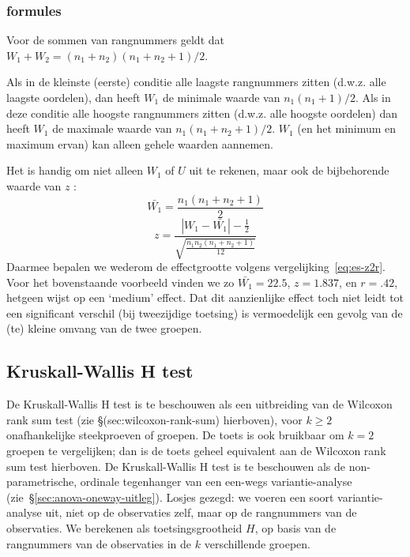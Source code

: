 \documentclass[
]{book}
\begin{document}
\hypertarget{formules-8}{%
\subsubsection{formules}\label{formules-8}}

Voor de sommen van rangnummers geldt dat
\(W_1 + W_2 = (n_1+n_2) (n_1+n_2+1) / 2\).

Als in de kleinste (eerste) conditie alle laagste rangnummers zitten
(d.w.z. alle laagste oordelen), dan heeft \(W_1\) de minimale waarde van
\(n_1 (n_1+1) /2\). Als in deze conditie alle hoogste rangnummers zitten
(d.w.z. alle hoogste oordelen) dan heeft \(W_1\) de maximale waarde van
\(n_1 (n_1+n_2+1) / 2\). \(W_1\) (en het minimum en maximum ervan) kan
alleen gehele waarden aannemen.

Het is handig om niet alleen \(W_1\) of \(U\) uit te rekenen, maar ook de
bijbehorende waarde van \(z\) \citep{Ferg89}:
\begin{equation}
  \label{eq:Wilcoxon-ranksum}
\bar{W_1} = \frac{ n_1 (n_1+n_2+1) }{ 2 }
\end{equation}
\begin{equation}
   \label{eq:Wilcoxon-ranksum-z}
  z = \frac{ |W_1-\bar{W_1}|-\frac{1}{2} }{ \sqrt{ \frac{n_1 n_2 (n_1+n_2+1)}{12} } }
\end{equation}
Daarmee bepalen we wederom de effectgrootte volgens
vergelijking~\eqref{eq:es-z2r}.
Voor het bovenstaande voorbeeld vinden we zo
\(\bar{W_1}=22.5\), \(z=1.837\), en \(r=.42\), hetgeen wijst op een `medium'
effect. Dat dit aanzienlijke effect toch niet leidt tot een significant
verschil (bij tweezijdige toetsing) is vermoedelijk een gevolg van de
(te) kleine omvang van de twee groepen.

\hypertarget{kruskall-wallis-h-test}{%
\subsection{Kruskall-Wallis H test}\label{kruskall-wallis-h-test}}

De Kruskall-Wallis H test is te beschouwen als een uitbreiding van de
Wilcoxon rank sum test (zie
§(sec:wilcoxon-rank-sum) hierboven), voor \(k \ge 2\) onafhankelijke
steekproeven of groepen. De toets is ook bruikbaar om \(k=2\) groepen te
vergelijken; dan is de toets geheel equivalent aan de Wilcoxon rank sum
test hierboven. De Kruskall-Wallis H test is te beschouwen als de
non-parametrische, ordinale tegenhanger van een een-wegs
variantie-analyse
(zie~§\ref{sec:anova-oneway-uitleg}). Losjes gezegd: we voeren een
soort variantie-analyse uit, niet op de observaties zelf, maar op de
rangnummers van de observaties. We berekenen als toetsingsgrootheid \(H\),
op basis van de rangnummers van de observaties in de \(k\) verschillende
groepen.
\end{document}
